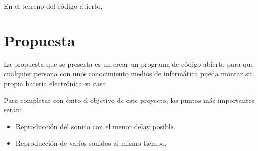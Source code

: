         En el terreno del código abierto, %


    \section{Propuesta} %
    \label{sec:Propuesta}

        La propuesta que se presenta es un crear un programa de código abierto para que cualquier persona con unos
        conocimiento medios de informática pueda montar su propia batería electrónica en casa.

        Para completar con éxito el objetivo de este proyecto, los puntos más importantes serán:
        \begin{itemize}
            \item Reproducción del sonido con el menor delay posible.
            \item Reproducción de varios sonidos al mismo tiempo.
        \end{itemize}


